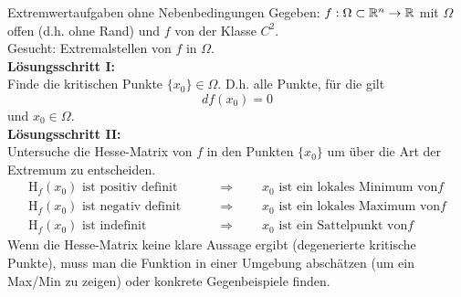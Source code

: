 \begin{Rezept}[label=R1]{Extremwertaufgaben ohne Nebenbedingungen}{}
	Gegeben: $f:\Omega\subset \mathbb{R}^n \to \mathbb{R}$ mit $\Omega$ offen (d.h. ohne Rand) und $f$ von der Klasse $C^2$.\\
	Gesucht: Extremalstellen von $f$ in $\Omega$.\\
	\newline
	\textbf{Lösungsschritt I:}\\
	Finde die kritischen Punkte $\{x_0\} \in \Omega$. D.h. alle Punkte, für die gilt
	\begin{equation*}
	df(x_0)=0
	\end{equation*}
	und $x_0 \in \Omega$.\\
	\textbf{Lösungsschritt II:}\\
	Untersuche die Hesse-Matrix von $f$ in den Punkten $\{x_0\}$ um über die Art der Extremum zu entscheiden.
	\begin{align*}
	\text{H}_f(x_0) \text{ ist positiv definit} \qquad &\Rightarrow \qquad x_0 \text{ ist ein lokales Minimum von} f\\
	\text{H}_f(x_0) \text{ ist negativ definit} \qquad &\Rightarrow \qquad x_0 \text{ ist ein lokales Maximum von} f\\
	\text{H}_f(x_0) \text{ ist indefinit} \qquad &\Rightarrow \qquad x_0 \text{ ist ein Sattelpunkt von} f
	\end{align*}
	Wenn die Hesse-Matrix keine klare Aussage ergibt (degenerierte kritische Punkte), muss man die Funktion in einer Umgebung abschätzen (um ein Max/Min zu zeigen) oder konkrete Gegenbeispiele finden.
\end{Rezept}

